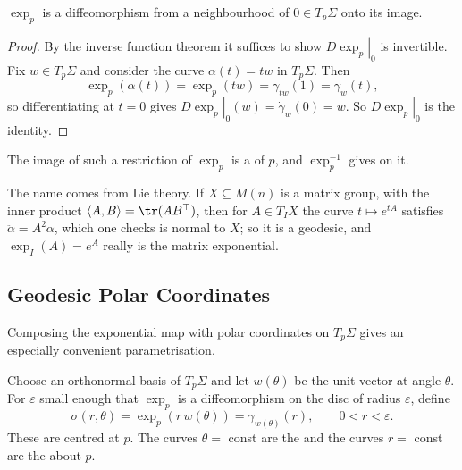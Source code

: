 \documentclass[a4paper]{scrartcl}
\begin{document}
\begin{proposition}
    $\exp_p$ is a diffeomorphism from a neighbourhood of $0 \in T_p\Sigma$ onto its image.
\end{proposition}
\begin{proof}
    By the inverse function theorem it suffices to show $\left.D\exp_p\right|_0$ is invertible. Fix $w \in T_p\Sigma$ and consider the curve $\alpha(t) = tw$ in $T_p\Sigma$. Then
    $$
    \exp_p(\alpha(t)) = \exp_p(tw) = \gamma_{tw}(1) = \gamma_w(t),
    $$
    so differentiating at $t = 0$ gives $\left.D\exp_p\right|_0(w) = \dot\gamma_w(0) = w$. So $\left.D\exp_p\right|_0$ is the identity.
\end{proof}

\begin{definition}
    The image of such a restriction of $\exp_p$ is a  of $p$, and $\exp_p^{-1}$ gives  on it.
\end{definition}

\begin{remark}
    The name comes from Lie theory. If $X \subseteq M(n)$ is a matrix group, with the inner product $\langle A, B\rangle = \tr(AB^\top)$, then for $A \in T_I X$ the curve $t \mapsto e^{tA}$ satisfies $\ddot\alpha = A^2\alpha$, which one checks is normal to $X$; so it is a geodesic, and $\exp_I(A) = e^A$ really is the matrix exponential.
\end{remark}

\subsection{Geodesic Polar Coordinates}

Composing the exponential map with polar coordinates on $T_p\Sigma$ gives an especially convenient parametrisation.

\begin{definition}
    Choose an orthonormal basis of $T_p\Sigma$ and let $w(\theta)$ be the unit vector at angle $\theta$. For $\varepsilon$ small enough that $\exp_p$ is a diffeomorphism on the disc of radius $\varepsilon$, define
    $$
    \sigma(r, \theta) = \exp_p\left(r\, w(\theta)\right) = \gamma_{w(\theta)}(r), \qquad 0 < r < \varepsilon.
    $$
    These are  centred at $p$. The curves $\theta = $ const are the  and the curves $r = $ const are the  about $p$.
\end{definition}
\end{document}
